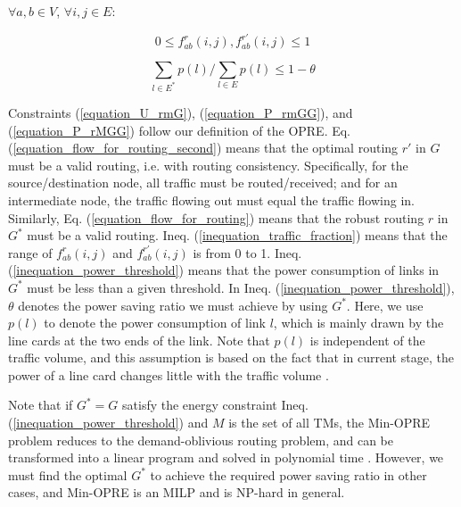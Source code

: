 \documentclass[conference]{IEEEtran}
\begin{document}
\begin{center}
    \vspace{0.1in}
    $\forall a,b \in V$, $\forall i,j \in E$: \quad \quad \quad \quad \quad \quad \quad \quad \quad \quad \quad
    \vspace{-0.15in}
\end{center}

\begin{equation}
\label{inequation_traffic_fraction}
    0 \leq f^r_{ab}(i,j),f^{r'}_{ab}(i,j) \leq 1
\end{equation}

\begin{equation}
\label{inequation_power_threshold}
    \sum_{l \in E^*} p(l) / \sum_{l \in E} p(l) \leq 1 - \theta
\end{equation}

Constraints (\ref{equation_U_rmG}), (\ref{equation_P_rmGG}), and (\ref{equation_P_rMGG}) follow our definition of the OPRE. Eq. (\ref{equation_flow_for_routing_second}) means that the optimal routing $r'$ in $G$ must be a valid routing, i.e. with routing consistency. Specifically, for the source/destination node, all traffic must be routed/received; and for an intermediate node, the traffic flowing out must equal the traffic flowing in. Similarly, Eq. (\ref{equation_flow_for_routing}) means that the robust routing $r$ in $G^*$ must be a valid routing. Ineq. (\ref{inequation_traffic_fraction}) means that the range of $f^r_{ab}(i,j)$ and $f^{r'}_{ab}(i,j)$ is from 0 to 1. Ineq. (\ref{inequation_power_threshold}) means that the power consumption of links in $G^*$ must be less than a given threshold. In Ineq. (\ref{inequation_power_threshold}), $\theta$ denotes the power saving ratio we must achieve by using $G^*$. Here, we use $p(l)$ to denote the power consumption of link $l$, which is mainly drawn by the line cards at the two ends of the link. Note that $p(l)$ is independent of the traffic volume, and this assumption is based on the fact that in current stage, the power of a line card changes little with the traffic volume \cite{networking:hopbyhop}.

Note that if $G^* = G$ satisfy the energy constraint Ineq. (\ref{inequation_power_threshold}) and $M$ is the set of all TMs, the Min-OPRE problem reduces to the demand-oblivious routing problem, and can be transformed into a linear program and solved in polynomial time \cite{networking:oblivious}. However, we must find the optimal $G^*$ to achieve the required power saving ratio in other cases, and Min-OPRE is an MILP and is NP-hard in general.
\end{document}
